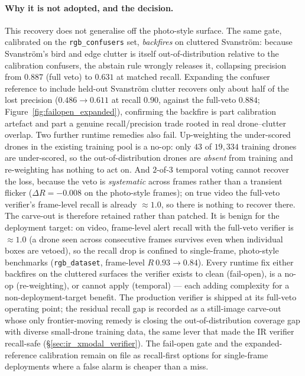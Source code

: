 \documentclass[12pt,a4paper,oneside,openright]{book}
\begin{document}
\paragraph{Why it is not adopted, and the decision.}
This recovery does not generalise off the photo-style surface. The same gate, calibrated on the \texttt{rgb\_confusers} set, \emph{backfires} on cluttered Svanstr\"om: because Svanstr\"om's bird and edge clutter is itself out-of-distribution relative to the calibration confusers, the abstain rule wrongly releases it, collapsing precision from $0.887$ (full veto) to $0.631$ at matched recall.
Expanding the confuser reference to include held-out Svanstr\"om clutter recovers only about half of the lost precision ($0.486 \to 0.611$ at recall $0.90$, against the full-veto $0.884$; Figure~\ref{fig:failopen_expanded}), confirming the backfire is part calibration artefact and part a genuine recall/precision trade rooted in real drone--clutter overlap.
Two further runtime remedies also fail. Up-weighting the under-scored drones in the existing training pool is a no-op: only $43$ of $19{,}334$ training drones are under-scored, so the out-of-distribution drones are \emph{absent} from training and re-weighting has nothing to act on. And $2$-of-$3$ temporal voting cannot recover the loss, because the veto is \emph{systematic} across frames rather than a transient flicker ($\Delta R = -0.008$ on the photo-style frames); on true video the full-veto verifier's frame-level recall is already $\approx 1.0$, so there is nothing to recover there.
The carve-out is therefore retained rather than patched. It is benign for the deployment target: on video, frame-level alert recall with the full-veto verifier is $\approx 1.0$ (a drone seen across consecutive frames survives even when individual boxes are vetoed), so the recall drop is confined to single-frame, photo-style benchmarks (\texttt{rgb\_dataset}, frame-level $R\ 0.93 \to 0.84$). Every runtime fix either backfires on the cluttered surfaces the verifier exists to clean (fail-open), is a no-op (re-weighting), or cannot apply (temporal) --- each adding complexity for a non-deployment-target benefit. The production verifier is shipped at its full-veto operating point; the residual recall gap is recorded as a still-image carve-out whose only frontier-moving remedy is closing the out-of-distribution coverage gap with diverse small-drone training data, the same lever that made the IR verifier recall-safe (\S\ref{sec:ir_xmodal_verifier}). The fail-open gate and the expanded-reference calibration remain on file as recall-first options for single-frame deployments where a false alarm is cheaper than a miss.
\end{document}
